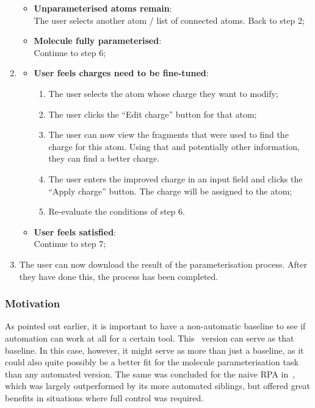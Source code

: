 \begin{enumerate}[itemsep=.1em, parsep=.2em, topsep=0em]
  \begin{itemize}[leftmargin=0cm, itemsep=.1em, parsep=.1em]
  \item[]{\bf Unparameterised atoms remain}:\\The user selects another atom / list of connected atoms. Back to step 2;
  \item[] {\bf Molecule fully parameterised}:\\Continue to step 6;
  \end{itemize}
\item
  \begin{itemize}[leftmargin=0cm, itemsep=.1em, parsep=.1em]
  \item[] {\bf User feels charges need to be fine-tuned}:
    \begin{enumerate}
    \item The user selects the atom whose charge they want to modify;
    \item The user clicks the ``Edit charge'' button for that atom;
    \item The user can now view the fragments that were used to find the charge for this atom. Using that and potentially other information, they can find a better charge.
    \item The user enters the improved charge in an input field and clicks the ``Apply charge'' button. The charge will be assigned to the atom;
    \item Re-evaluate the conditions of step 6.
    \end{enumerate}
  \item[]{\bf User feels satisfied}:\\Continue to step 7;
  \end{itemize}
\item The user can now download the result of the parameterisation process. After they have done this, the process has been completed.
\end{enumerate}

\subsubsection{Motivation}
As pointed out earlier, it is important to have a non-automatic baseline to see if automation can work at all for a certain tool. This \IDa\ version can serve as that baseline. In this case, however, it might serve as more than just a baseline, as it could also quite possibly be a better fit for the molecule parameterisation task than any automated version. The same was concluded for the naive RPA in~\cite{payne2000varying}, which was largely outperformed by its more automated siblings, but offered great benefits in situations where full control was required.

